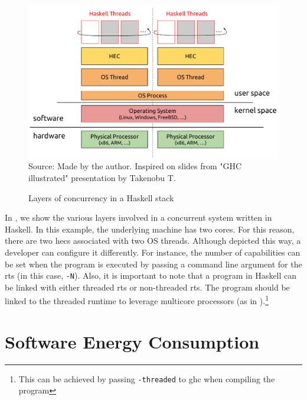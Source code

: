 \begin{figure}[htp]
  \centering
  \caption{Layers of concurrency in a Haskell stack}
  \includegraphics[width=\columnwidth]{images/haskell-concurrency-layers}
  \footnotesize{Source: Made by the author. Inspired on slides from "GHC illustrated" presentation by Takenobu T.}
  \label{fig:haskell-conc-layers}
\end{figure}

In , we show the various layers involved in a concurrent system written in Haskell. In this example, the underlying machine has two cores. For this reason, there are two \acp{hec} associated with two OS threads. Although depicted this way, a developer can configure it differently. For instance, the number of capabilities can be set when the program is executed  by passing a command line argument for the \ac{rts} (in this case, \texttt{-N}). Also, it is important to note that a program in Haskell can be linked with either threaded \ac{rts} or non-threaded \ac{rts}. The program should be linked to the threaded runtime to leverage multicore processors (as in ).\footnote{This can be achieved by passing \texttt{-threaded} to \ac{ghc} when compiling the program}






\section{Software Energy Consumption}
\lipsum[1-4]

